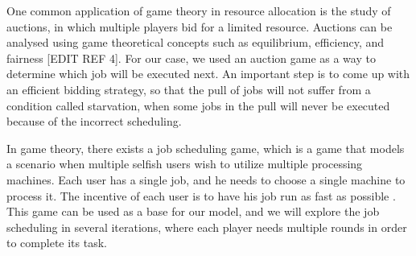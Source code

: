 One common application of game theory in resource allocation is the study of auctions, in which multiple players bid for a limited resource. Auctions can be analysed using game theoretical concepts such as equilibrium, efficiency, and fairness [EDIT REF 4]. For our case, we used an auction game as a way to determine which job will be executed next. An important step is to come up with an efficient bidding strategy, so that the pull of jobs will not suffer from a condition called starvation, when some jobs in the pull will never be executed because of the incorrect scheduling.

In game theory, there exists a job scheduling game, which is a game that models a scenario when multiple selfish users wish to utilize multiple processing machines. Each user has a single job, and he needs to choose a single machine to process it. The incentive of each user is to have his job run as fast as possible \cite{9244046}. This game can be used as a base for our model, and we will explore the job scheduling in several iterations, where each player needs multiple rounds in order to complete its task.

